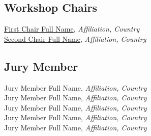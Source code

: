 
\subsection{Workshop Chairs}
\href{https://orcid.org/0000-0001-2345-6789}{First Chair Full Name}, \emph{Affiliation, Country}\\
\href{https://orcid.org/0000-0001-2345-6789}{Second Chair Full Name}, \emph{Affiliation, Country}\\


\subsection{Jury Member}
Jury Member Full Name, \emph{Affiliation, Country}\\
Jury Member Full Name, \emph{Affiliation, Country}\\
Jury Member Full Name, \emph{Affiliation, Country}\\
Jury Member Full Name, \emph{Affiliation, Country}\\
Jury Member Full Name, \emph{Affiliation, Country}\\
